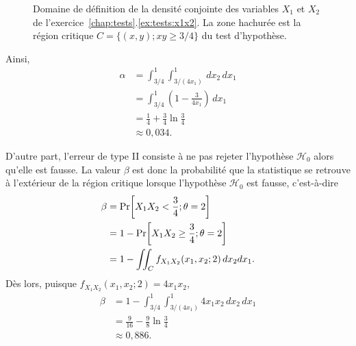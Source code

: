 \begin{solution}{6.2}
\begin{enumerate}
\begin{figure}
\begin{knitrout}
\end{knitrout}
        \caption{Domaine de définition de la densité conjointe des
          variables $X_1$ et $X_2$ de
          l'exercice~\ref{chap:tests}.\ref{ex:tests:x1x2}. La zone
          hachurée est la région critique $C = \{(x, y); x y \geq
          3/4\}$ du test d'hypothèse.}
        \label{fig:tests:x1x2}
      \end{figure}
      Ainsi,
      \begin{align*}
        \alpha
        &= \int_{3/4}^1 \int_{3/(4 x_1)}^1 \,dx_2\,dx_1 \\
        &= \int_{3/4}^1
        \left(
          1 - \frac{3}{4x_1}
        \right)\, dx_1 \\
        &= \frac{1}{4} + \frac{3}{4} \ln \frac{3}{4} \\
        &\approx 0,034.
      \end{align*}

      D'autre part, l'erreur de type II consiste à ne pas rejeter
      l'hypothèse $ \mathcal{H}_0$ alors qu'elle est fausse. La valeur $\beta$
      est donc la probabilité que la statistique se retrouve à
      l'extérieur de la région critique lorsque l'hypothèse $ \mathcal{H}_0$ est
      fausse, c'est-à-dire
      \begin{align*}
        \beta &= \mathrm{Pr}\! \left[ X_1 X_2 < \frac{3}{4}; \theta = 2 \right] \\
        &= 1 - \mathrm{Pr}\! \left[ X_1 X_2 \geq \frac{3}{4}; \theta = 2 \right]\\
        &= 1 - \iint_C f_{X_1 X_2}(x_1, x_2; 2)\, dx_2 dx_1.
      \end{align*}
      Dès lors, puisque $f_{X_1 X_2}(x_1, x_2; 2) = 4 x_1 x_2$,
      \begin{align*}
        \beta
        &= 1 - \int_{3/4}^1 \int_{3/(4x_1)}^1 4 x_1 x_2\, dx_2\, dx_1\\
        &= \frac{9}{16} - \frac{9}{8}\ln \frac{3}{4} \\
        &\approx 0,886.
      \end{align*}
    \end{enumerate}
  
\end{solution}
